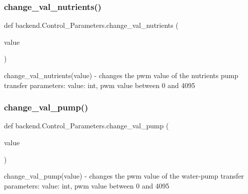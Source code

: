 \subsubsection{\texorpdfstring{change\+\_\+val\+\_\+nutrients()}{change\_val\_nutrients()}}
{\footnotesize\ttfamily def backend.\+Control\+\_\+\+Parameters.\+change\+\_\+val\+\_\+nutrients (\begin{DoxyParamCaption}\item[{}]{value }\end{DoxyParamCaption})}

\begin{DoxyVerb}change_val_nutrients(value)
    - changes the pwm value of the nutrients pump
transfer parameters:
    value: int, pwm value between 0 and 4095
\end{DoxyVerb}
 \mbox{\label{classbackend_1_1Control__Parameters_acaf4c2a8133bddbd5cd7a8e557f322ee_acaf4c2a8133bddbd5cd7a8e557f322ee}} 
\subsubsection{\texorpdfstring{change\+\_\+val\+\_\+pump()}{change\_val\_pump()}}
{\footnotesize\ttfamily def backend.\+Control\+\_\+\+Parameters.\+change\+\_\+val\+\_\+pump (\begin{DoxyParamCaption}\item[{}]{value }\end{DoxyParamCaption})}

\begin{DoxyVerb}change_val_pump(value)
    - changes the pwm value of the water-pump
transfer parameters:
    value: int, pwm value between 0 and 4095
\end{DoxyVerb}
 \mbox{\label{classbackend_1_1Control__Parameters_a7ea529f7257a3e272b93324296dd5844_a7ea529f7257a3e272b93324296dd5844}} 
